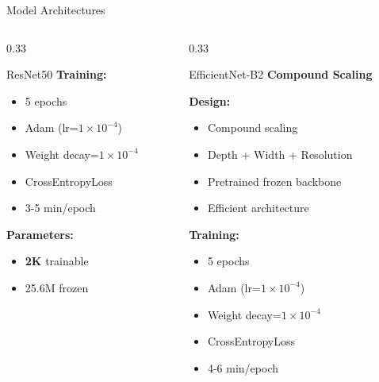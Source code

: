 \documentclass[aspectratio=169]{beamer}
\begin{document}
\begin{frame}{Model Architectures}
\begin{columns}[T]
\begin{column}{0.33\textwidth}
\begin{block}{ResNet50}
                \textbf{Training:}
                \begin{itemize}
                    \scriptsize
                    \item 5 epochs
                    \item Adam (lr=$1 \times 10^{-4}$)
                    \item Weight decay=$1 \times 10^{-4}$
                    \item CrossEntropyLoss
                    \item 3-5 min/epoch
                \end{itemize}
                
                \textbf{Parameters:}
                \begin{itemize}
                    \scriptsize
                    \item \textbf{2K} trainable
                    \item 25.6M frozen
                \end{itemize}
            \end{block}
        \end{column}
        
        \begin{column}{0.33\textwidth}
            \begin{block}{EfficientNet-B2}
                \textcolor{green!60!black}{\textbf{Compound Scaling}}
                
                \textbf{Design:}
                \begin{itemize}
                    \scriptsize
                    \item Compound scaling
                    \item Depth + Width + Resolution
                    \item Pretrained frozen backbone
                    \item Efficient architecture
                \end{itemize}
                
                \textbf{Training:}
                \begin{itemize}
                    \scriptsize
                    \item 5 epochs
                    \item Adam (lr=$1 \times 10^{-4}$)
                    \item Weight decay=$1 \times 10^{-4}$
                    \item CrossEntropyLoss
                    \item 4-6 min/epoch
                \end{itemize}
                

\end{block}
\end{column}
\end{columns}
\end{frame}
\end{document}
